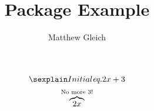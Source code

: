 \documentclass{report}
\title{Package Example}
\author{Matthew Gleich}
\date{ }
\begin{document}
    \maketitle

    \[ \initialeq{2x + 3} \]
    \[ \overbrace{2x}^{\textrm{No more 3!}} \]
\end{document}
